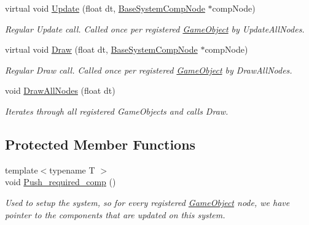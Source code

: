 \begin{DoxyCompactItemize}
virtual void \hyperlink{classBaseSystem_a465191589a1ef8b8f3a8e20fa4656d47}{Update} (float dt, \hyperlink{structBaseSystemCompNode}{Base\+System\+Comp\+Node} $\ast$comp\+Node)
\begin{DoxyCompactList}\small\item\em Regular Update call. Called once per registered \hyperlink{classGameObject}{Game\+Object} by Update\+All\+Nodes. \end{DoxyCompactList}\item 
\mbox{\label{classBaseSystem_a94339337789820c707da572d140a0923}} 
virtual void \hyperlink{classBaseSystem_a94339337789820c707da572d140a0923}{Draw} (float dt, \hyperlink{structBaseSystemCompNode}{Base\+System\+Comp\+Node} $\ast$comp\+Node)
\begin{DoxyCompactList}\small\item\em Regular Draw call. Called once per registered \hyperlink{classGameObject}{Game\+Object} by Draw\+All\+Nodes. \end{DoxyCompactList}\item 
void \hyperlink{classBaseSystem_af8f5ce5a033d06bd9aeb944d2a193e74}{Draw\+All\+Nodes} (float dt)
\begin{DoxyCompactList}\small\item\em Iterates through all registered Game\+Objects and calls Draw. \end{DoxyCompactList}\end{DoxyCompactItemize}
\subsection*{Protected Member Functions}
\begin{DoxyCompactItemize}
\item 
{\footnotesize template$<$typename T $>$ }\\void \hyperlink{classBaseSystem_a672d8b7902414c5a4b46d10f5f403785}{Push\+\_\+required\+\_\+comp} ()
\begin{DoxyCompactList}\small\item\em Used to setup the system, so for every registered \hyperlink{classGameObject}{Game\+Object} node, we have pointer to the components that are updated on this system. \end{DoxyCompactList}\end{DoxyCompactItemize}
